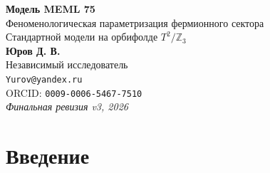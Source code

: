 \documentclass[11pt,a4paper]{article}
\numberwithin{equation}{section}
\begin{document}
\begin{center}
    {\LARGE\bf Модель MEML 75}\\[0.2cm]
    {\large Феноменологическая параметризация фермионного сектора\\
    Стандартной модели на орбифолде $T^2/\mathbb{Z}_3$}\\[0.6cm]
    {\bf Юров Д. В.}\\[0.15cm]
{\small Независимый исследователь}\\[0.1cm]
{\small \texttt{Yurov@yandex.ru}}\\[0.15cm]
{\small ORCID: \texttt{0009-0006-5467-7510}}\\[0.3cm]
    {\it Финальная ревизия v3, 2026}
\end{center}

\vspace{0.4cm}

\begin{abstract}
\noindent
Мы представляем финальную ревизию модели MEML 75 ---
феноменологической параметризации фермионного сектора
Стандартной модели (СМ) на шестимерном орбифолде
$T^2/\mathbb{Z}_3$. Модель описывает шесть отношений
масс фермионов, матрицу CKM и матрицу PMNS, включая
CP-нарушение, через геометрию компактификации.

Проведено одиннадцать независимых тестов. Ранг
якобиана наблюдаемых по параметрам равен 4 в PMNS
и 4 в CKM; это совпадает с числом наблюдаемых в каждой
матрице. Число физически независимых параметров в
фермионном секторе --- 14 (6 масс + 4 CKM + 4 PMNS).
Устойчиво воспроизводится только иерархия масс
нейтрино (NO); остальные нейтринные наблюдаемые
($\Delta m^2_{21}/\Delta m^2_{31}$, $\delta_{CP}$,
$\Sigma m_\nu$, $m_{\beta\beta}$) оказываются
недоопределёнными и не могут считаться
предсказаниями. Полный перебор дискретных
$\mathbb{Z}_3$-фаз (531\,441 комбинация) не
воспроизводит PMNS с точностью лучше $10^{-3}$,
что указывает на необходимость непрерывных фаз.
Модель \textbf{не является теорией всего}:
гравитация не квантована, калибровочный и
хиггсовский секторы не выведены.
\end{abstract}

\vspace{0.3cm}
\tableofcontents
\vspace{0.5cm}

\section{Введение}
\end{document}
